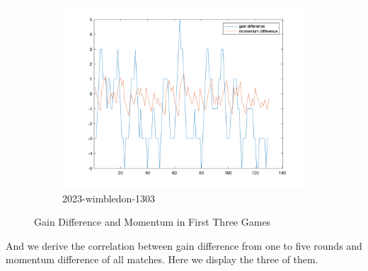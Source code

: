\begin{figure}[H]
\begin{subfigure}[b]{0.34\textwidth}
        \includegraphics[width=\linewidth]{mainmatter/imgs/diff_match3.png}
        \caption{2023-wimbledon-1303}
    \end{subfigure}
    \caption{Gain Difference and Momentum in First Three Games}
    \label{fig:Gain Difference and Momentum}
\end{figure}

And we derive the correlation between gain difference from one to five rounds 
and momentum difference of all matches. Here we display the three of them.


